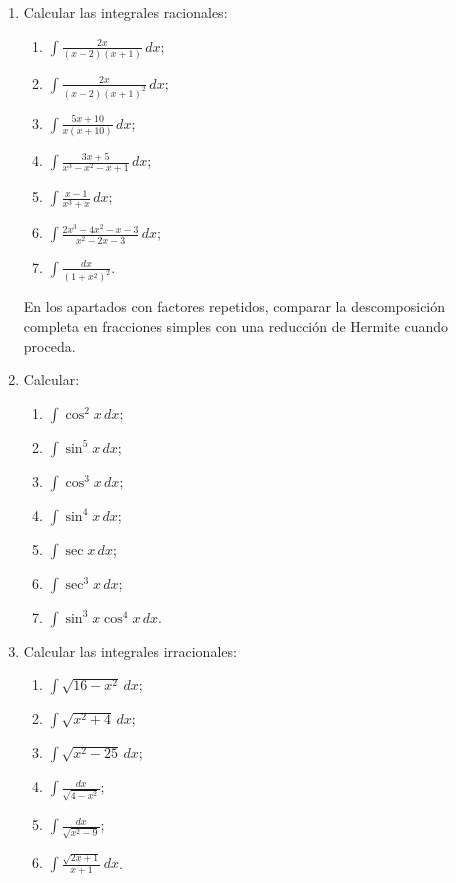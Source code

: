 \begin{enumerate}
\item Calcular las integrales racionales:
\begin{enumerate}[label=\alph*)]
\item $\displaystyle\int\frac{2x}{(x-2)(x+1)}\,dx$;
\item $\displaystyle\int\frac{2x}{(x-2)(x+1)^2}\,dx$;
\item $\displaystyle\int\frac{5x+10}{x(x+10)}\,dx$;
\item $\displaystyle\int\frac{3x+5}{x^3-x^2-x+1}\,dx$;
\item $\displaystyle\int\frac{x-1}{x^3+x}\,dx$;
\item $\displaystyle\int\frac{2x^3-4x^2-x-3}{x^2-2x-3}\,dx$;
\item $\displaystyle\int\frac{dx}{(1+x^2)^2}$.
\end{enumerate}
En los apartados con factores repetidos, comparar la descomposición completa en fracciones simples con una reducción de Hermite cuando proceda.

\item Calcular:
\begin{enumerate}[label=\alph*)]
\item $\displaystyle\int\cos^2x\,dx$;
\item $\displaystyle\int\sin^5x\,dx$;
\item $\displaystyle\int\cos^3x\,dx$;
\item $\displaystyle\int\sin^4x\,dx$;
\item $\displaystyle\int\sec x\,dx$;
\item $\displaystyle\int\sec^3x\,dx$;
\item $\displaystyle\int\sin^3x\cos^4x\,dx$.
\end{enumerate}

\item Calcular las integrales irracionales:
\begin{enumerate}[label=\alph*)]
\item $\displaystyle\int\sqrt{16-x^2}\,dx$;
\item $\displaystyle\int\sqrt{x^2+4}\,dx$;
\item $\displaystyle\int\sqrt{x^2-25}\,dx$;
\item $\displaystyle\int\frac{dx}{\sqrt{4-x^2}}$;
\item $\displaystyle\int\frac{dx}{\sqrt{x^2-9}}$;
\item $\displaystyle\int\frac{\sqrt{2x+1}}{x+1}\,dx$.
\end{enumerate}


\end{enumerate}
